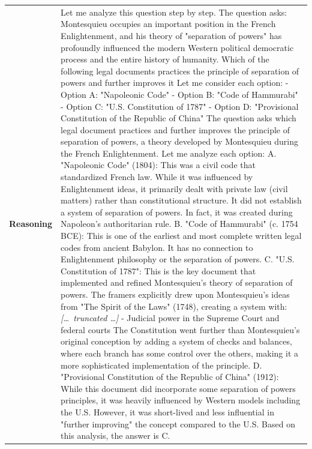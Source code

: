 \begin{longtable}{@{}l p{13cm}@{}}
  \textbf{Reasoning} & Let me analyze this question step by step. \newline The question asks: Montesquieu occupies an important position in the French Enlightenment, and his theory of "separation of powers" has profoundly influenced the modern Western political democratic process and the entire history of humanity. Which of the following legal documents practices the principle of separation of powers and further improves it \newline Let me consider each option: \newline - Option A: "Napoleonic Code" \newline - Option B: "Code of Hammurabi" \newline - Option C: "U.S. Constitution of 1787" \newline - Option D: "Provisional Constitution of the Republic of China" \newline The question asks which legal document practices and further improves the principle of separation of powers, a theory developed by Montesquieu during the French Enlightenment. Let me analyze each option: \newline A. "Napoleonic Code" (1804): This was a civil code that standardized French law. While it was influenced by Enlightenment ideas, it primarily dealt with private law (civil matters) rather than constitutional structure. It did not establish a system of separation of powers. In fact, it was created during Napoleon's authoritarian rule. B. "Code of Hammurabi" (c. 1754 BCE): This is one of the earliest and most complete written legal codes from ancient Babylon. It has no connection to Enlightenment philosophy or the separation of powers. C. "U.S. Constitution of 1787": This is the key document that implemented and refined Montesquieu's theory of separation of powers. The framers explicitly drew upon Montesquieu's ideas from "The Spirit of the Laws" (1748), creating a system with: \newline \textit{[\ldots\ truncated \ldots]} \newline - Judicial power in the Supreme Court and federal courts \newline The Constitution went further than Montesquieu's original conception by adding a system of checks and balances, where each branch has some control over the others, making it a more sophisticated implementation of the principle. D. "Provisional Constitution of the Republic of China" (1912): While this document did incorporate some separation of powers principles, it was heavily influenced by Western models including the U.S. However, it was short-lived and less influential in "further improving" the concept compared to the U.S. \newline Based on this analysis, the answer is C.  \\

\end{longtable}
